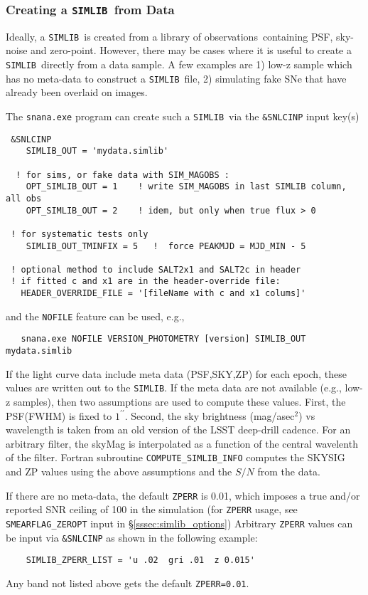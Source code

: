 \documentclass[12pt]{article}
\newcommand{\simlib}{{\tt SIMLIB}}
\newcommand{\obss}{observations}
\begin{document}
  \subsubsection{Creating a \simlib\ from Data}
  \label{sss:data_simlib}

Ideally, a \simlib\ is created from a library of
\obss\ containing PSF, sky-noise and zero-point.
However, there may be cases where it is useful to
create a \simlib\ directly from a data sample. 
A few examples are 
1) low-z sample which has no meta-data to construct a \simlib\ file, 
2) simulating fake SNe that have already been overlaid on images.

The {\tt snana.exe} program can create such a
\simlib\ via the {\tt \&SNLCINP} input key(s)
%
\begin{verbatim}
 &SNLCINP
    SIMLIB_OUT = 'mydata.simlib'

  ! for sims, or fake data with SIM_MAGOBS :
    OPT_SIMLIB_OUT = 1    ! write SIM_MAGOBS in last SIMLIB column, all obs
    OPT_SIMLIB_OUT = 2    ! idem, but only when true flux > 0

 ! for systematic tests only
    SIMLIB_OUT_TMINFIX = 5   !  force PEAKMJD = MJD_MIN - 5

 ! optional method to include SALT2x1 and SALT2c in header
 ! if fitted c and x1 are in the header-override file:
   HEADER_OVERRIDE_FILE = '[fileName with c and x1 colums]'
\end{verbatim}
%
and the {\tt NOFILE} feature can be used, e.g.,
\begin{verbatim}
   snana.exe NOFILE VERSION_PHOTOMETRY [version] SIMLIB_OUT mydata.simlib
\end{verbatim}


If the light curve data include meta data (PSF,SKY,ZP)
for each epoch, these values are written out to the \simlib.
If the meta data are not available (e.g., low-z samples),
then two assumptions are used to compute these values. 
First, the PSF(FWHM) is fixed to $1^{\prime\prime}$.
Second, the sky brightness (mag/asec$^2$) vs wavelength is 
taken from an old version of the LSST deep-drill cadence.
For an arbitrary filter, the skyMag is interpolated as a
function of the central wavelenth of the filter.
Fortran subroutine {\tt COMPUTE\_SIMLIB\_INFO}
computes the SKYSIG and ZP values using the above
assumptions and the $S/N$ from the data.


If there are no meta-data, the default {\tt ZPERR} is 0.01, 
which imposes a true and/or reported SNR ceiling of 100 in the simulation
(for {\tt ZPERR} usage, see {\tt SMEARFLAG\_ZEROPT} input in
  \S\ref{sssec:simlib_options})
Arbitrary {\tt ZPERR} values can be input via 
{\tt \&SNLCINP} as shown in the following example:
%
\begin{verbatim}
    SIMLIB_ZPERR_LIST = 'u .02  gri .01  z 0.015'
\end{verbatim}
%
Any band not listed above gets the default {\tt ZPERR=0.01}.
\end{document}
